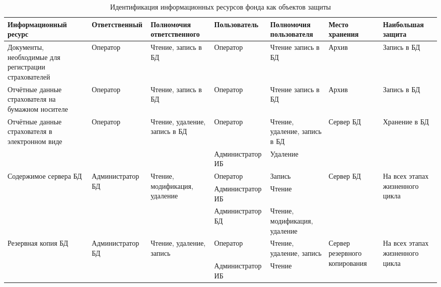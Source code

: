 \newpage


\begin{sidewaystable}[h]
\begin{longtable}{|p{5cm}|p{2.5cm}|p{3cm}|p{3.5cm}|p{2.5cm}|p{2.5cm}|p{2.7cm}|}
\caption{Идентификация информационных ресурсов фонда как объектов
      защиты}
\label{infsource} \\\hline
Информаци\-онный ресурс &
Ответствен\-ный &
Полномочия ответственного  &
Пользователь &
Полномочия пользователя &
Место хранения &
Наибольшая защита
\\\hline

Документы, необходимые для регистрации страхователей &
Оператор &
Чтение, запись в БД &
Оператор &
Чтение запись в БД &
Архив &
Запись в БД \\\hline

Отчётные данные страхователя на бумажном носителе &
Оператор &
Чтение, запись в БД &
Оператор &
Чтение запись в БД &
Архив &
Запись в БД \\\hline

Отчётные данные страхователя в электронном виде &
Оператор &
Чтение, удаление, запись в БД &
Оператор &
Чтение, удаление, запись в БД &
Сервер БД &
Хранение в БД \\\cline{4-5}

&&&
Администратор ИБ &
Удаление && \\\hline

\multirow{2}{5cm}{Содержимое сервера БД} &
\multirow{2}{2.5cm}{Админист\-ратор БД} &
\multirow{2}{3cm}{Чтение, модификация, удаление} &
Оператор &
Запись &
Сервер БД &
\multirow{2}{2.7cm}{На всех этапах жизненного цикла} \\\cline{4-5}

&&&
Администратор ИБ &
Чтение && \\\cline{4-5}

&&&
Администратор БД &
Чтение, модификация, удаление && \\\hline

\multirow{2}{5cm}{Резервная копия БД} &
\multirow{2}{2.5cm}{Админист\-ратор БД} &
\multirow{2}{3cm}{Чтение, удаление, запись} &
Оператор &
Чтение, удаление, запись &
\multirow{2}{2.5cm}{Сервер резервного копирова\-ния} &
\multirow{2}{2.7cm}{На всех этапах жизненного цикла} \\\cline{4-5}

&&&
Администратор ИБ &
Чтение && \\\hline
\end{longtable}
\end{sidewaystable}



